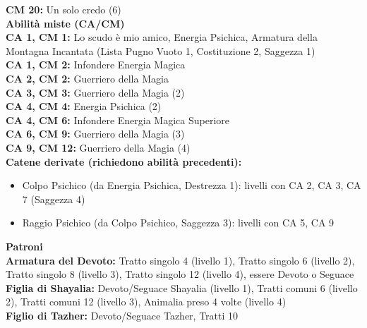 \begin{multicols}{2}
	\textbf{CM 20:} Un solo credo (6)\\

\textbf{{\large Abilità miste (CA/CM)}}\\

	\textbf{CA 1, CM 1:} Lo scudo è mio amico, Energia Psichica, Armatura della Montagna Incantata (Lista Pugno Vuoto 1, Costituzione 2, Saggezza 1)\\

	\textbf{CA 1, CM 2:} Infondere Energia Magica\\

	\textbf{CA 2, CM 2:} Guerriero della Magia\\

	\textbf{CA 3, CM 3:} Guerriero della Magia (2)\\

	\textbf{CA 4, CM 4:} Energia Psichica (2)\\

	\textbf{CA 4, CM 6:} Infondere Energia Magica Superiore\\

	\textbf{CA 6, CM 9:} Guerriero della Magia (3)\\

	\textbf{CA 9, CM 12:} Guerriero della Magia (4)\\

	\textbf{Catene derivate (richiedono abilità precedenti):}
	\begin{itemize}
		\item Colpo Psichico (da Energia Psichica, Destrezza 1): livelli con CA 2, CA 3, CA 7 (Saggezza 4)
		\item Raggio Psichico (da Colpo Psichico, Saggezza 3): livelli con CA 5, CA 9
	\end{itemize}

\textbf{{\large Patroni}}\\

	\textbf{Armatura del Devoto:} Tratto singolo 4 (livello 1), Tratto singolo 6 (livello 2), Tratto singolo 8 (livello 3), Tratto singolo 12 (livello 4), essere Devoto o Seguace\\

	\textbf{Figlia di Shayalia:} Devoto/Seguace Shayalia (livello 1), Tratti comuni 6 (livello 2), Tratti comuni 12 (livello 3), Animalia preso 4 volte (livello 4)\\

	\textbf{Figlio di Tazher:} Devoto/Seguace Tazher, Tratti 10\\


\end{multicols}
